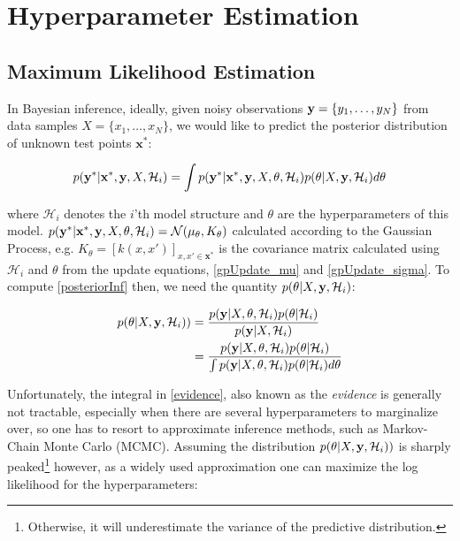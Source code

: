 \chapter{Hyperparameter Estimation}
\label{Chapter2}

\section{Maximum Likelihood Estimation}

In Bayesian inference, ideally, given noisy observations $\mathbf{y} = \{y_1,\ldots,y_N\}$ from data samples $X = \{x_1,\ldots,x_N\}$, we would like to predict the posterior distribution of unknown test points $\mathbf{x}^{*}$:

\begin{equation}
p(\mathbf{y}^{*}|\mathbf{x}^{*},\mathbf{y},X,\mathcal{H}_{i}) = \int p(\mathbf{y}^{*}|\mathbf{x}^{*},\mathbf{y},X,\theta,\mathcal{H}_{i}) p(\theta|X,\mathbf{y},\mathcal{H}_{i})d\theta \label{posteriorInf} 
\end{equation}

where $\mathcal{H}_i$ denotes the $i$'th model structure and $\theta$ are the hyperparameters of this model. $p(\mathbf{y}^{*}|\mathbf{x}^{*},\mathbf{y},X,\theta,\mathcal{H}_{i}) = \mathcal{N}(\mu_{\theta}, K_{\theta})$ calculated according to the Gaussian Process, e.g. $K_{\theta} = [k(x,x')]_{x,x' \in \mathbf{x}^{*}}$ is the covariance matrix calculated using $\mathcal{H}_{i}$ and $\theta$ from the update equations, \eqref{gpUpdate_mu} and \eqref{gpUpdate_sigma}. To compute \eqref{posteriorInf} then, we need the quantity $p(\theta|X,\mathbf{y},\mathcal{H}_{i})$:

\begin{align}
p(\theta|X,\mathbf{y},\mathcal{H}_{i})) &= \frac{p(\mathbf{y}|X,\theta,\mathcal{H}_{i})p(\theta|\mathcal{H}_{i})}{p(\mathbf{y}|X,\mathcal{H}_{i})} \label{posteriorTheta} \\
&= \frac{p(\mathbf{y}|X,\theta,\mathcal{H}_{i})p(\theta|\mathcal{H}_{i})}{\int p(\mathbf{y}|X,\theta,\mathcal{H}_{i}) p(\theta|\mathcal{H}_{i})d\theta} \label{evidence}
\end{align}

Unfortunately, the integral in \eqref{evidence}, also known as the \emph{evidence} is generally not tractable, especially when there are several hyperparameters to marginalize over, so one has to resort to approximate inference methods, such as Markov-Chain Monte Carlo (MCMC). Assuming the distribution $p(\theta|X,\mathbf{y},\mathcal{H}_{i}))$ is sharply peaked\footnote{Otherwise, it will underestimate the variance of the predictive distribution.} however, as a widely used approximation one can maximize the log likelihood for the hyperparameters:

